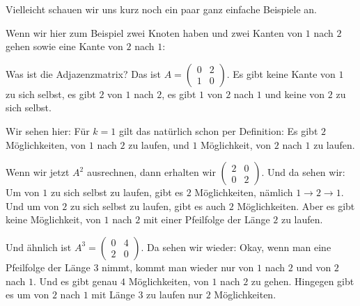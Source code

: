 \begin{spoken-clean}[01:11:54 - 01:14:32]
Vielleicht schauen wir uns kurz noch ein paar ganz einfache Beispiele an.

Wenn wir hier zum Beispiel zwei Knoten haben und zwei Kanten von $1$ nach $2$ gehen sowie eine Kante von $2$ nach $1$:

Was ist die Adjazenzmatrix? Das ist $A = \begin{pmatrix} 0 & 2 \\ 1 & 0 \end{pmatrix}$. Es gibt keine Kante von $1$ zu sich selbst, es gibt $2$ von $1$ nach $2$, es gibt $1$ von $2$ nach $1$ und keine von $2$ zu sich selbst.

Wir sehen hier: Für $k=1$ gilt das natürlich schon per Definition: Es gibt $2$ Möglichkeiten, von $1$ nach $2$ zu laufen, und $1$ Möglichkeit, von $2$ nach $1$ zu laufen.

Wenn wir jetzt $A^2$ ausrechnen, dann erhalten wir $\begin{pmatrix} 2 & 0 \\ 0 & 2 \end{pmatrix}$. Und da sehen wir: Um von $1$ zu sich selbst zu laufen, gibt es $2$ Möglichkeiten, nämlich $1 \to 2 \to 1$. Und um von $2$ zu sich selbst zu laufen, gibt es auch $2$ Möglichkeiten. Aber es gibt keine Möglichkeit, von $1$ nach $2$ mit einer Pfeilfolge der Länge $2$ zu laufen.

Und ähnlich ist $A^3 = \begin{pmatrix} 0 & 4 \\ 2 & 0 \end{pmatrix}$. Da sehen wir wieder: Okay, wenn man eine Pfeilfolge der Länge $3$ nimmt, kommt man wieder nur von $1$ nach $2$ und von $2$ nach $1$. Und es gibt genau $4$ Möglichkeiten, von $1$ nach $2$ zu gehen. Hingegen gibt es um von $2$ nach $1$ mit Länge $3$ zu laufen nur $2$ Möglichkeiten.
\end{spoken-clean}

